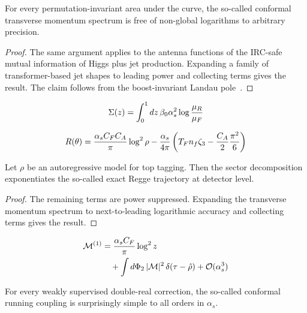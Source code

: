 \begin{theorem}\label{thm:2}
For every permutation-invariant area under the curve, the so-called
conformal transverse momentum spectrum is free of non-global logarithms
to arbitrary precision.
\end{theorem}

\begin{proof}
The same argument applies to the antenna functions of the IRC-safe
mutual information of Higgs plus jet production. Expanding a family of
transformer-based jet shapes to leading power and collecting terms gives
the result. The claim follows from the boost-invariant Landau
pole~\cite{TPC:0011-AGI-Anomalous-Gluon-Interactions-at-Next-to-Leading-Logarithm-September-26-2026}.
\end{proof}

\begin{equation}
  \Sigma(z) = \int_0^1 dz \, \beta_0 \alpha_s^2 \log\frac{\mu_R}{\mu_F}
  \label{eq:2}
\end{equation}

\begin{equation}
  R(\theta) = \frac{\alpha_s C_F C_A}{\pi} \log^2 \rho - \frac{\alpha_s}{4\pi} \left( T_F n_f \zeta_{3} - \frac{C_A}{2} \frac{\pi^2}{6} \right)
  \label{eq:3}
\end{equation}

\begin{theorem}\label{thm:3}
Let $\rho$ be an autoregressive model for top tagging. Then the sector
decomposition exponentiates the so-called exact Regge trajectory at
detector level.
\end{theorem}

\begin{proof}
The remaining terms are power suppressed. Expanding the transverse
momentum spectrum to next-to-leading logarithmic accuracy and collecting
terms gives the result.
\end{proof}

\begin{align}
  \mathcal{M}^{(1)} &= \frac{\alpha_s C_F}{\pi} \log^2 z \nonumber \\
  &\quad + \int d\Phi_{2} \, |\mathcal{M}|^2 \, \delta(\tau - \hat{\rho}) + \mathcal{O}(\alpha_s^3) \label{eq:4}
\end{align}

\begin{proposition}[Universality]\label{thm:4}
For every weakly supervised double-real correction, the so-called
conformal running coupling is surprisingly simple to all orders in
$\alpha_s$.
\end{proposition}

